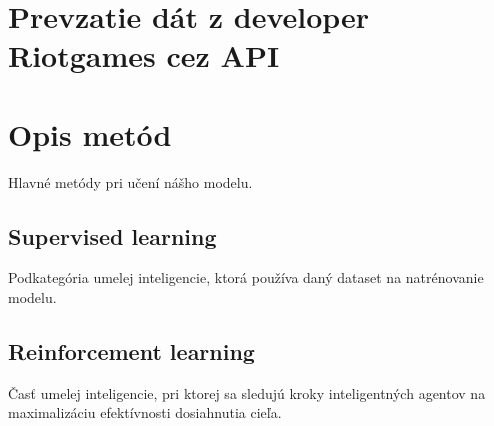 \section{Prevzatie dát z developer Riotgames cez API}

\section{Opis metód}
Hlavné metódy pri učení nášho modelu.
\subsection{Supervised learning}
Podkategória umelej inteligencie, ktorá používa daný dataset na natrénovanie modelu.

\subsection{Reinforcement learning}
Časť umelej inteligencie, pri ktorej sa sledujú kroky inteligentných agentov na maximalizáciu efektívnosti dosiahnutia cieľa.

